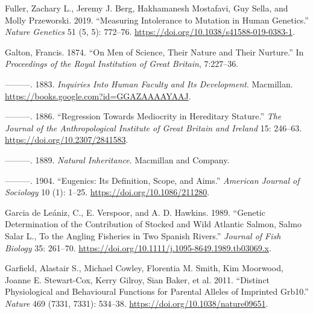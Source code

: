 \documentclass[
]{book}
\newlength{\cslhangindent}
\newlength{\cslentryspacingunit} %
\newenvironment{CSLReferences}[2] %
 {%
  \setlength{\parindent}{0pt}
  \ifodd #1
  \let\oldpar\par
  \def\par{\hangindent=\cslhangindent\oldpar}
  \fi
  \setlength{\parskip}{#2\cslentryspacingunit}
 }%
 {}
\begin{document}
\begin{CSLReferences}{1}{0}
\leavevmode{}%
Fuller, Zachary L., Jeremy J. Berg, Hakhamanesh Mostafavi, Guy Sella, and Molly Przeworski. 2019. {``Measuring Intolerance to Mutation in Human Genetics.''} \emph{Nature Genetics} 51 (5, 5): 772--76. \url{https://doi.org/10.1038/s41588-019-0383-1}.

\leavevmode{}%
Galton, Francis. 1874. {``On {Men} of {Science}, Their {Nature} and Their {Nurture}.''} In \emph{Proceedings of the {Royal Institution} of {Great Britain}}, 7:227--36.

\leavevmode{}%
---------. 1883. \emph{Inquiries {Into Human Faculty} and {Its Development}}. {Macmillan}. \url{https://books.google.com?id=GGAZAAAAYAAJ}.

\leavevmode{}%
---------. 1886. {``Regression {Towards Mediocrity} in {Hereditary Stature}.''} \emph{The Journal of the Anthropological Institute of Great Britain and Ireland} 15: 246--63. \url{https://doi.org/10.2307/2841583}.

\leavevmode{}%
---------. 1889. \emph{Natural Inheritance}. {Macmillan and Company}.

\leavevmode{}%
---------. 1904. {``Eugenics: {Its Definition}, {Scope}, and {Aims}.''} \emph{American Journal of Sociology} 10 (1): 1--25. \url{https://doi.org/10.1086/211280}.

\leavevmode{}%
Garcia de Leániz, C., E. Verspoor, and A. D. Hawkins. 1989. {``Genetic Determination of the Contribution of Stocked and Wild {Atlantic} Salmon, {Salmo} Salar {L}., To the Angling Fisheries in Two {Spanish} Rivers.''} \emph{Journal of Fish Biology} 35: 261--70. \url{https://doi.org/10.1111/j.1095-8649.1989.tb03069.x}.

\leavevmode{}%
Garfield, Alastair S., Michael Cowley, Florentia M. Smith, Kim Moorwood, Joanne E. Stewart-Cox, Kerry Gilroy, Sian Baker, et al. 2011. {``Distinct Physiological and Behavioural Functions for Parental Alleles of Imprinted {Grb10}.''} \emph{Nature} 469 (7331, 7331): 534--38. \url{https://doi.org/10.1038/nature09651}.


\end{CSLReferences}
\end{document}

